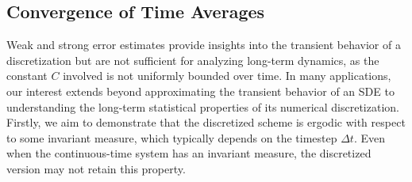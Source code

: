 \documentclass[11pt, twoside]{report}
\begin{document}
\subsection{Convergence of Time Averages} \label{sec:conv_time_avg}
Weak and strong error estimates provide insights into the transient behavior of a discretization but are not sufficient for analyzing long-term dynamics, as the constant $C$ involved is not uniformly bounded over time. In many applications, our interest extends beyond approximating the transient behavior of an SDE to understanding the long-term statistical properties of its numerical discretization. Firstly, we aim to demonstrate that the discretized scheme is ergodic with respect to some invariant measure, which typically depends on the timestep $\Delta t$. Even when the continuous-time system has an invariant measure, the discretized version may not retain this property.
\end{document}
